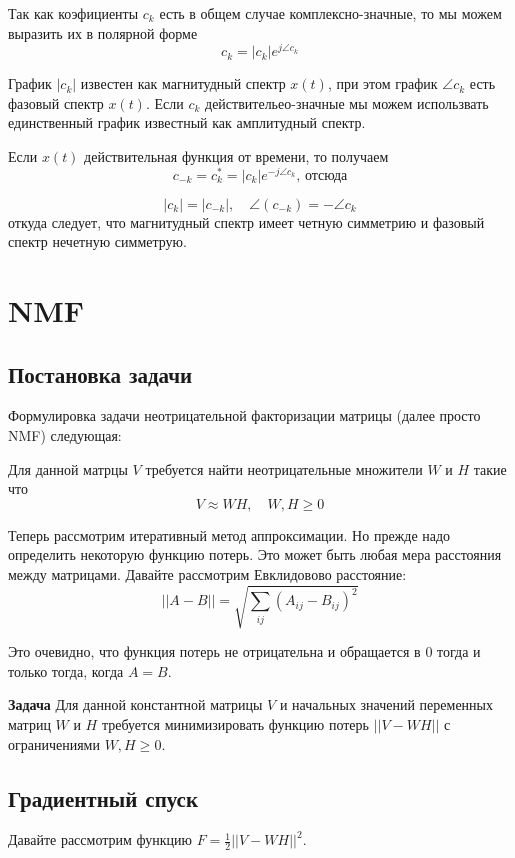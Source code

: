 \documentclass[oneside, final, 12pt]{extarticle}
\begin{document}
  Так как коэфициенты $c_k$ есть в общем случае комплексно-значные,
  то мы можем выразить их в полярной форме
  \[
    c_k = |c_k| e^{j\angle c_k}
  \]

  График $|c_k|$ известен как магнитудный спектр $x(t)$,
  при этом график $\angle c_k$ есть фазовый спектр $x(t)$.
  Если $c_k$ действительео-значные мы можем использвать единственный
  график известный как амплитудный спектр.

  Если $x(t)$ действительная функция от времени, то получаем
  \[
    c_{-k} = c_k^* = |c_k| e^{-j\angle c_k} \text{, отсюда}
  \]

  \[
    |c_k| = |c_{-k}|, \quad \angle (c_{-k}) = -\angle c_k
  \]
  откуда следует, что магнитудный спектр имеет четную симметрию
  и фазовый спектр нечетную симметрую.

\cleardoublepage

\section{NMF}

\subsection{Постановка задачи}

Формулировка задачи неотрицательной факторизации матрицы (далее просто NMF)
следующая:

Для данной матрцы $V$ требуется найти неотрицательные множители $W$ и $H$
такие что
\[
  V \approx WH, \quad W,H \geqslant 0
\]

Теперь рассмотрим итеративный метод аппроксимации.
Но прежде надо определить некоторую функцию потерь.
Это может быть любая мера расстояния между матрицами.
Давайте рассмотрим Евклидовово расстояние:
\[
  ||A - B|| = \sqrt{\sum_{ij} (A_{ij} - B_{ij})^2}
\]

Это очевидно, что функция потерь не отрицательна
и обращается в 0 тогда и только тогда, когда $A = B$.

\textbf{Задача} Для данной константной матрицы $V$
и начальных значений переменных матриц $W$ и $H$
требуется минимизировать функцию потерь $||V-WH||$
с ограничениями $W,H \geqslant 0$.

\subsection{Градиентный спуск}
Давайте рассмотрим функцию $F = \frac{1}{2}||V - WH||^2$.
\end{document}
